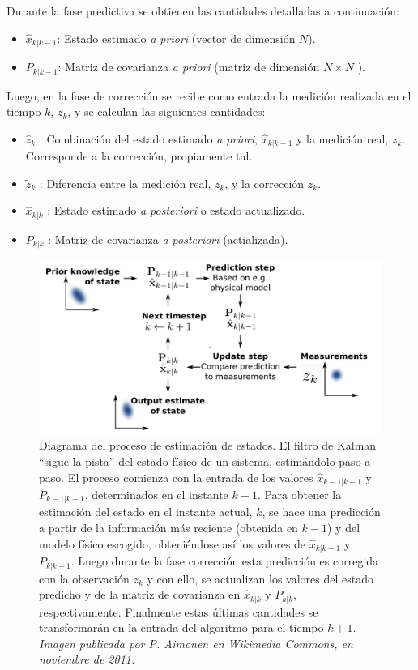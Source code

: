 Durante la fase predictiva se obtienen las cantidades detalladas a continuaci\'on:
 
\begin{itemize}
\item $\hat{x}_{k|k-1}$: Estado estimado \textit{a priori} (vector de dimensi\'on $N$). 
\item $P_{k|k-1}$: Matriz de covarianza \textit{a priori} (matriz de dimensi\'on $N\times N$ ).
\end{itemize}
\bigskip

Luego, en la fase de correcci\'on se recibe como entrada la medici\'on realizada en el tiempo $k$, $z_k$, y se calculan las siguientes cantidades:

\begin{itemize}
\item $\hat{z}_k$ : Combinaci\'on del estado estimado \textit{a priori}, $\hat{x}_{k|k-1}$ y la medici\'on real, $z_k$. Corresponde a la correcci\'on, propiamente tal.
\item $\tilde{z}_k$ : Diferencia entre la medici\'on real, $z_k$, y la correcci\'on $\hat{z}_k$.
\item $\hat{x}_{k|k}$ : Estado estimado \textit{a posteriori} o estado actualizado.
\item $P_{k|k}$ : Matriz de covarianza \textit{a posteriori} (actializada).
\end{itemize}
\bigskip
 
\begin{figure}
\centering
\includegraphics[scale=.2]{images/diag_kalman}
\caption{Diagrama del proceso de estimaci\'on de estados. El filtro de Kalman ``sigue la pista'' del estado f\'isico de un sistema, estim\'andolo paso a paso. El proceso comienza con la entrada de los valores $\hat{x}_{k-1|k-1}$ y $P_{k-1|k-1}$, determinados en el instante $k-1$. Para obtener la estimaci\'on del estado en el instante actual, $k$, se hace una predicci\'on a partir de la informaci\'on m\'as reciente (obtenida en $k-1$) y del modelo f\'isico escogido, obteni\'endose as\'i los valores de $\hat{x}_{k|k-1}$ y $P_{k|k-1}$. Luego durante la fase correcci\'on esta predicci\'on es corregida con la observaci\'on $z_k$ y con ello, se actualizan los valores del estado predicho y de la matriz de covarianza en $\hat{x}_{k|k}$ y $P_{k|k}$, respectivamente. Finalmente estas \'ultimas cantidades se transformar\'an en la entrada del algoritmo para el tiempo $k+1$. \textit{Imagen publicada por P. Aimonen en Wikimedia Commons, en noviembre de 2011.}}
\label{fig:diag}
\end{figure} 
 
